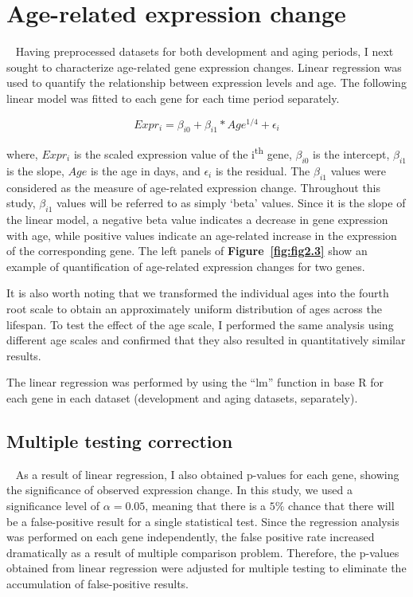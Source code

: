 \section{Age-related expression change}~\label{sec:exp-change}
Having preprocessed datasets for both development and aging periods, I next sought to characterize age-related gene expression changes. 
Linear regression was used to quantify the relationship between expression levels and age. 
The following linear model was fitted to each gene for each time period separately.

\begin{equation}
    Expr_i = \beta_{i0} + \beta_{i1} * Age^{1/4} + \epsilon_i
    \label{eq:exp_change}
\end{equation}

where, $Expr_i$ is the scaled expression value of the i\textsuperscript{th} gene, $\beta_{i0}$ is the intercept, $\beta_{i1}$ is the slope, $Age$ is the age in days, and $\epsilon_i$ is the residual.
The $\beta_{i1}$ values were considered as the measure of age-related expression change. Throughout this study, $\beta_{i1}$ values will be referred to as simply `beta' values.
Since it is the slope of the linear model, a negative beta value indicates a decrease in gene expression with age, while positive values indicate an age-related increase in the expression of the corresponding gene. 
The left panels of \textbf{Figure~\ref{fig:fig2.3}} show an example of quantification of age-related expression changes for two genes.

It is also worth noting that we transformed the individual ages into the fourth root scale to obtain an approximately uniform distribution of ages across the lifespan.
To test the effect of the age scale, I performed the same analysis using different age scales and confirmed that they also resulted in quantitatively similar results.

The linear regression was performed by using the ``lm'' function in base R for each gene in each dataset (development and aging datasets, separately).

\subsection{Multiple testing correction}~\label{subsec:p.adjust}
As a result of linear regression, I also obtained p-values for each gene, showing the significance of observed expression change.
In this study, we used a significance level of $\alpha = 0.05$, meaning that there is a $5\%$ chance that there will be a false-positive result for a single statistical test.
Since the regression analysis was performed on each gene independently, the false positive rate increased dramatically as a result of multiple comparison problem.
Therefore, the p-values obtained from linear regression were adjusted for multiple testing to eliminate the accumulation of false-positive results.

